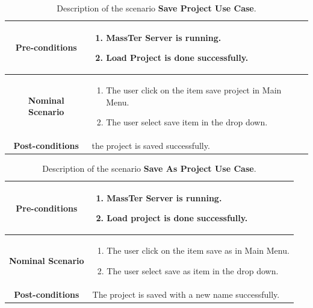   \begin{table}
	\caption{Description of the scenario \textbf{Save Project Use Case}.}
	\label{DSTabSP}
	\centering
	\begin{tabular}{|c|p{10cm}|}
		\hline 	
		\textbf{Pre-conditions } & \begin{enumerate}
			\item MassTer Server is running.
			\item Load Project is done successfully.
		\end{enumerate}  \\ 
		\hline                     
		\textbf{Nominal Scenario } & \begin{enumerate}
			\item The user click on the item save project in Main Menu.
			\item The user select save item in the drop down.
		\end{enumerate} \\ 
		\hline 
		\textbf{Post-conditions} & the project is saved successfully. \\
		\hline 
	\end{tabular}
\end{table}
   \begin{table}
 \caption{Description of the scenario \textbf{Save As Project Use Case}.}
 	\label{DSTabSAP}
 	\centering
 	\begin{tabular}{|c|p{10cm}|}
 		\hline 	
 		\textbf{Pre-conditions } & \begin{enumerate}
 			\item MassTer Server is running.
 			\item Load project is done successfully.
 		\end{enumerate} \\ 
 		\hline                     
 		\textbf{Nominal Scenario } & \begin{enumerate}
 			\item The user click on the item save as in Main Menu.
 			\item The user select save as item in the drop down.
 		\end{enumerate} \\ 
 		\hline 
 		\textbf{Post-conditions} & The project is saved with a new name successfully. \\
 		\hline 
 	\end{tabular}
 \end{table}
\clearpage
\newpage

 
